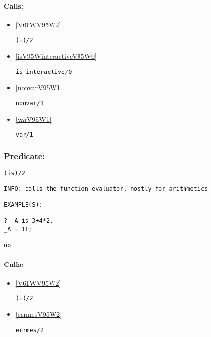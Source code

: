 \paragraph{Calls:} 
\begin{itemize}
\item \ref{V61WV95W2} 
\begin{verbatim}
(=)/2
\end{verbatim}

\item \ref{isV95WinteractiveV95W0} 
\begin{verbatim}
is_interactive/0
\end{verbatim}

\item \ref{nonvarV95W1} 
\begin{verbatim}
nonvar/1
\end{verbatim}

\item \ref{varV95W1} 
\begin{verbatim}
var/1
\end{verbatim}

\end{itemize}

\subsubsection{Predicate:} \label{isV95W2}

\begin{verbatim}
(is)/2
\end{verbatim}

{\small \begin{verbatim}
INFO: calls the function evaluator, mostly for arithmetics

EXAMPLE(S):

?-_A is 3+4*2.
_A = 11;

no

\end{verbatim}}
\paragraph{Calls:} 
\begin{itemize}
\item \ref{V61WV95W2} 
\begin{verbatim}
(=)/2
\end{verbatim}

\item \ref{errmesV95W2} 
\begin{verbatim}
errmes/2
\end{verbatim}

\end{itemize}
